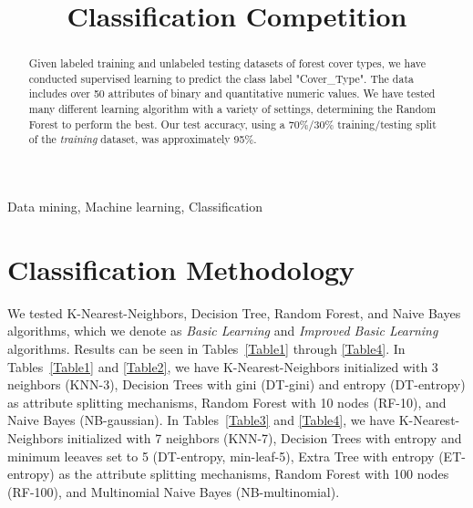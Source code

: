 \documentclass[10pt, conference, compsocconf]{IEEEtran}
\begin{document}
\title{Classification Competition}

\newcommand{\superast}{\raisebox{9pt}{$\ast$}}
\newcommand{\superdagger}{\raisebox{9pt}{$\dagger$}}
\newcommand{\superddagger}{\raisebox{9pt}{$\ddagger$}}
\newcommand{\superS}{\raisebox{9pt}{$\S$}}
\newcommand{\superP}{\raisebox{9pt}{$\P$}}

\author{
}

\maketitle

\begin{abstract}
Given labeled training and unlabeled testing datasets of forest cover types, we have conducted supervised learning to predict the class label "Cover\_Type". The data includes over 50 attributes of binary and quantitative numeric values. We have tested many different learning algorithm with a variety of settings, determining the Random Forest to perform the best. Our test accuracy, using a 70\%/30\% training/testing split of the \textit{training} dataset, was approximately 95\%. 
\end{abstract}

\begin{IEEEkeywords}
Data mining, Machine learning, Classification
\end{IEEEkeywords}

\section{Classification Methodology}\label{description}

We tested K-Nearest-Neighbors, Decision Tree, Random Forest, and Naive Bayes algorithms, which we denote as \textit{Basic Learning} and \textit{Improved Basic Learning} algorithms. Results can be seen in Tables~\ref{Table1} through \ref{Table4}. In Tables~\ref{Table1} and \ref{Table2}, we have K-Nearest-Neighbors initialized with 3 neighbors (KNN-3), Decision Trees with gini (DT-gini) and entropy (DT-entropy) as attribute splitting mechanisms, Random Forest with 10 nodes (RF-10), and Naive Bayes (NB-gaussian). In Tables~\ref{Table3} and \ref{Table4}, we have K-Nearest-Neighbors initialized with 7 neighbors (KNN-7), Decision Trees with entropy and minimum leeaves set to 5 (DT-entropy, min-leaf-5), Extra Tree with entropy (ET-entropy) as the attribute splitting mechanisms, Random Forest with 100 nodes (RF-100), and Multinomial Naive Bayes (NB-multinomial). 
\end{document}
